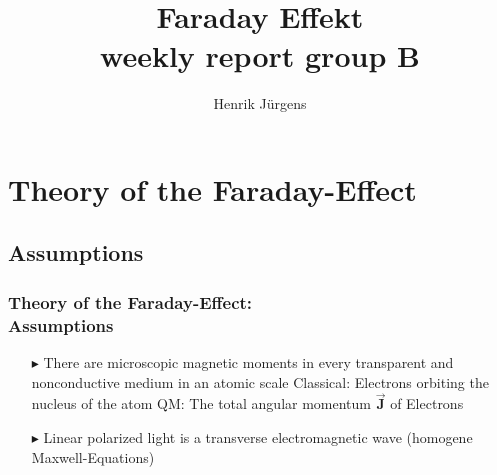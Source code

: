\documentclass[10pt,a4paper]{beamer}
\author{Henrik Jürgens}
\title{\textbf{Faraday Effekt}\\ weekly report group B}
\begin{document}
 \section{Theory of the Faraday-Effect}
\begin{frame} %
\subsection{Assumptions}
\frametitle{\textbf{Theory of the Faraday-Effect:} \\ Assumptions}
\pause
\begin{enumerate}
\item[$\blacktriangleright$]
There are microscopic magnetic moments in every transparent and nonconductive medium in an atomic scale\newline\newline\pause
 Classical: Electrons orbiting the nucleus of the atom\newline
 QM: The total angular momentum $\vec{\textbf{J}}$ of Electrons\newline\pause
\item[$\blacktriangleright$]
Linear polarized light is a transverse electromagnetic wave (homogene Maxwell-Equations)
  
\end{enumerate}
\end{frame}
\end{document}
